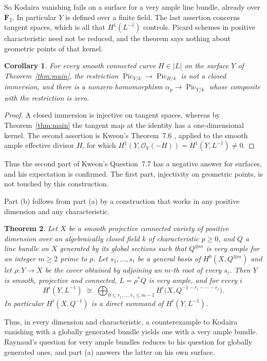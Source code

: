 \documentclass[11pt,a4paper]{article}
\theoremstyle{plain}
\newtheorem{theorem}{Theorem}
\newtheorem{corollary}[theorem]{Corollary}
\theoremstyle{remark}
\newcommand{\OO}{\mathcal O}
\newcommand{\F}{\mathbf F}
\newcommand{\Pic}{\operatorname{Pic}}
\begin{document}
So Kodaira vanishing fails on a surface for a very ample line bundle, already over $\overline{\F}_2$. In particular
$Y$ is defined over a finite field. The last assertion concerns tangent spaces, which is all that $H^1(L^{-1})$
controls. Picard schemes in positive characteristic need not be reduced, and the theorem says nothing about geometric
points of that kernel.

\begin{corollary}\label{cor:kweon}
For every smooth connected curve $H\in|L|$ on the surface $Y$ of Theorem~\ref{thm:main}, the restriction
$\Pic_{Y/k}\to\Pic_{H/k}$ is not a closed immersion, and there is a nonzero homomorphism $\alpha_p\to\Pic_{Y/k}$
whose composite with the restriction is zero.
\end{corollary}

\begin{proof}
A closed immersion is injective on tangent spaces, whereas by Theorem~\ref{thm:main} the tangent map at the identity
has a one-dimensional kernel. The second assertion is Kweon's Theorem~7.6 \cite[p.~18]{Kweon}, applied to the smooth
ample effective divisor $H$, for which $H^1(Y,\OO_Y(-H))=H^1(Y,L^{-1})\ne0$.
\end{proof}

Thus the second part of Kweon's Question~7.7 has a negative answer for surfaces, and his expectation is confirmed. The
first part, injectivity on geometric points, is not touched by this construction.

Part (b) follows from part (a) by a construction that works in any positive dimension and any characteristic.

\begin{theorem}\label{thm:roots}
Let $X$ be a smooth projective connected variety of positive dimension over an algebraically closed field $k$ of
characteristic $p\ge0$, and
$Q$ a line bundle on $X$ generated by its global sections such that $Q^{\otimes m}$ is very ample for an integer $m\ge2$
prime to $p$. Let $s_1,\dots,s_\ell$ be a general basis of $H^0(X,Q^{\otimes m})$ and let $\rho:Y\to X$ be the cover
obtained by adjoining an $m$-th root of every $s_i$. Then $Y$ is smooth, projective and connected, $L=\rho^*Q$ is very
ample, and for every $i$
\[
 H^i(Y,L^{-1})\;\cong\;\bigoplus_{0\le r_1,\dots,r_\ell\le m-1} H^i\bigl(X,Q^{-1-r_1-\cdots-r_\ell}\bigr).
\]
In particular $H^i(X,Q^{-1})$ is a direct summand of $H^i(Y,L^{-1})$.
\end{theorem}

Thus, in every dimension and characteristic, a counterexample to Kodaira vanishing with a globally generated bundle
yields one with a very ample bundle. Raynaud's question for very ample bundles reduces to his question for globally
generated ones, and part (a) answers the latter on his own surface.
\end{document}
